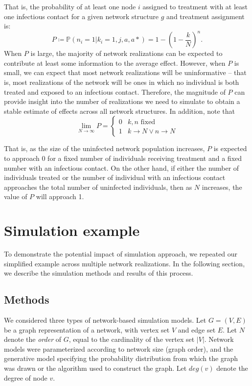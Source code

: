 \documentclass{article}
\theoremstyle{definition}
\begin{document}
That is, the probability of at least one node $i$ assigned to treatment with at least one infectious contact for a given network structure $g$ and treatment assignment is:
\begin{equation}\label{eq:18}
    P \coloneqq \mathbb{P}\left(n_{i}=1 \vert k_{i}=1,j,a,a*\right)=1-\left(1-\frac{k}{N}\right)^{n}.
\end{equation}
When $P$ is large, the majority of network realizations can be expected to contribute at least some information to the average effect. However, when $P$ is small, we can expect that most network realizations will be uninformative -- that is, most realizations of the network will be ones in which no individual is both treated and exposed to an infectious contact. Therefore, the magnitude of $P$ can provide insight into the number of realizations we need to simulate to obtain a stable estimate of effects across all network structures. In addition, note that
\begin{equation}\label{eq:19}
    \lim_{N \to \infty}P=\begin{cases}0 & k,n \text{ fixed} \\ 1 & k \to N \lor n \to N  \end{cases}
\end{equation}

That is, as the size of the uninfected network population increases, $P$ is expected to approach 0 for a fixed number of individuals receiving treatment and a fixed number with an infectious contact. On the other hand, if either the number of individuals treated or the number of individual with an infectious contact approaches the total number of uninfected individuals, then as $N$ increases, the value of $P$ will approach 1.

\section{Simulation example}
To demonstrate the potential impact of simulation approach, we repeated our simplified example across multiple network realizations. In the following section, we describe the simulation methods and results of this process.

\subsection{Methods}
We considered three types of network-based simulation models. Let $G=(V,E)$ be a graph representation of a network, with vertex set $V$ and edge set $E$. Let $N$ denote the \textit{order} of $G$, equal to the cardinality of the vertex set $\vert V \vert$. Network models were parameterized according to network size (graph order), and the generative model specifying the probability distribution from which the graph was drawn or the algorithm used to construct the graph. Let $deg(v)$ denote the degree of node $v$.
\end{document}
